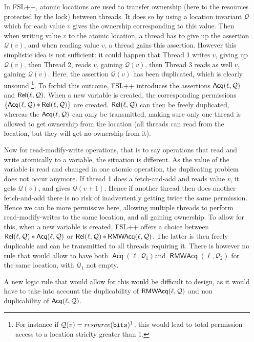 In FSL++, atomic locations are used to transfer ownership (here to the resources protected by the lock) between threads. It does so by using a location invariant $\mathcal{Q}$ which for each value $v$ gives the ownership corresponding to this value. Then when writing value $v$ to the atomic location, a thread has to give up the assertion $\mathcal{Q}(v)$, and when reading value $v$, a thread gains this assertion. However this simplistic idea is not sufficient: it could happen that Thread 1 writes $v$, giving up $\mathcal{Q}(v)$, then Thread 2, reads $v$, gaining $\mathcal{Q}(v)$, then Thread 3 reads as well $v$, gaining $\mathcal{Q}(v)$. Here, the assertion $\mathcal{Q}(v)$ has been duplicated, which is clearly unsound \footnote{For instance if $\mathcal{Q}(v) = resource(\texttt{bits})^{1}$, this would lead to total permission access to a location striclty greater than 1.}. To forbid this outcome, FSL++ introduces the assertions $\operatorname{\mathsf{Acq}}(\ell, \mathcal{Q})$ and $\operatorname{\mathsf{Rel}}(\ell, \mathcal{Q})$. When a new variable is created, the corresponding permissions $\{\operatorname{\mathsf{Acq}}(\ell, \mathcal{Q}) * \operatorname{\mathsf{Rel}}(\ell, \mathcal{Q})\}$ are created. $\operatorname{\mathsf{Rel}}(\ell, \mathcal{Q})$ can then be freely duplicated, whereas the $\operatorname{\mathsf{Acq}}(\ell, \mathcal{Q})$ can only be transmitted, making sure only one thread is allowed to get ownership from the location (all threads can read from the location, but they will get no ownership from it). 

Now for read-modify-write operations, that is to say operations that read and write atomically to a variable, the situation is different. As the value of the variable is read and changed in one atomic operation, the duplicating problem does not occur anymore. If thread 1 does a fetch-and-add and reads value $v$, it gets $\mathcal{Q}(v)$, and gives $\mathcal{Q}(v + 1)$. Hence if another thread then does another fetch-and-add there is no risk of inadvertently getting twice the same permission. Hence we can be more permissive here, allowing multiple threads to perform read-modify-writes to the same location, and all gaining ownership. To allow for this, when a new variable is created, FSL++ offers a choice between $\operatorname{\mathsf{Rel}}(\ell, \mathcal{Q}) * \operatorname{\mathsf{Acq}}(\ell, \mathcal{Q})$ or $\operatorname{\mathsf{Rel}}(\ell, \mathcal{Q}) * \operatorname{\mathsf{RMWAcq}}(\ell, \mathcal{Q})$. The latter is then freely duplicable and can be transmitted to all threads requiring it. There is however no rule that would allow to have both $\operatorname{\mathsf{Acq}}(\ell, \mathcal{Q}_1)$and $\operatorname{\mathsf{RMWAcq}}(\ell, \mathcal{Q}_2)$ for the same location, with $\mathcal{Q}_1$ not empty.

A new logic rule that would allow for this would be difficult to design, as it would have to take into account the duplicability of $\operatorname{\mathsf{RMWAcq}}(\ell, \mathcal{Q})$ and non duplicability of $\operatorname{\mathsf{Acq}}(\ell, \mathcal{Q})$.

